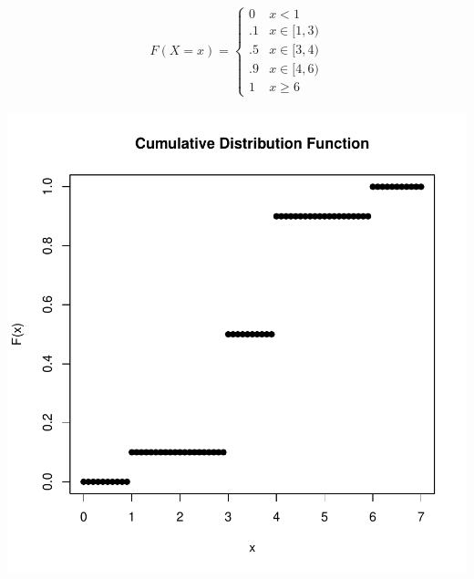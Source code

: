 \documentclass[letterpaper,12pt]{article}
\begin{document}
\begin{enumerate}[label=(\alph*)]
\begin{align*}
            F(X=x) = 
            \begin{cases}
                0 & x < 1 \\
                .1 & x \in [1, 3) \\
                .5 & x \in [3, 4) \\
                .9 & x \in [4, 6) \\
                1 & x \geq 6
            \end{cases}
        \end{align*}
        \begin{center}
            \includegraphics{cdf.pdf}
        \end{center}
\end{enumerate}
\end{document}
